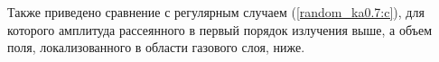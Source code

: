 Также приведено сравнение с регулярным случаем (\autoref{random_ka0.7:c}), для которого амплитуда рассеянного в первый порядок излучения выше, а объем поля, локализованного в области газового слоя, ниже.









